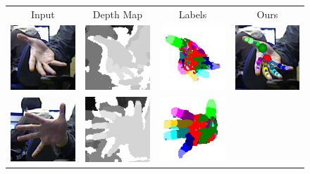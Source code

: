 \documentclass[10pt, a4paper]{article}
\begin{document}
\begin{figure}[!ht] 
	\centering
	\begin{tabular}{cccc}
		Input & Depth Map & Labels & Ours \\ 
		\includegraphics[width=2.7cm]{fig/hand/qual/rgb/image_0303.png} &
		\includegraphics[width=2.7cm]{fig/hand/qual/depth/image_0303.png} &
		\includegraphics[width=2.7cm]{fig/hand/qual/class/class-303.png} &
		\includegraphics[width=2.7cm]{fig/hand/qual/vote/image_0303.png}
		\label{fig/hand/multi1} \\ 
		\includegraphics[width=2.7cm]{fig/hand/qual/rgb/image_0520.png} &
		\includegraphics[width=2.7cm]{fig/hand/qual/depth/image_0520.png} &
		\includegraphics[width=2.7cm]{fig/hand/qual/class/class-520.png} &

\end{tabular}
\end{figure}
\end{document}
